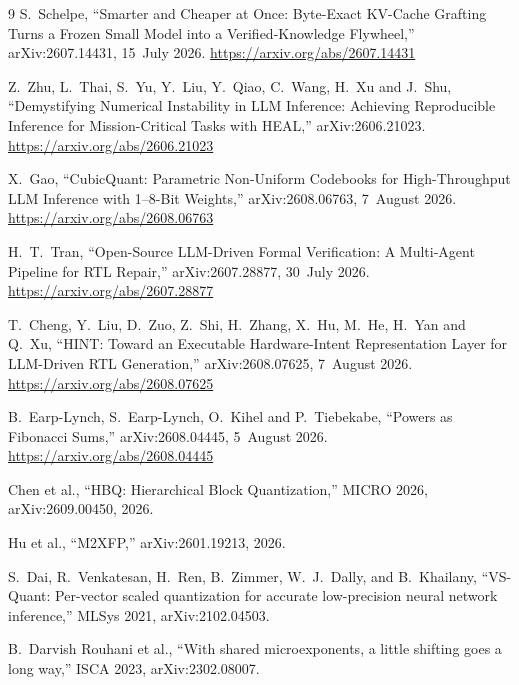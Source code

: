 \documentclass[11pt]{article}
\theoremstyle{definition}
\begin{document}
\begin{thebibliography}{9}
 S.~Schelpe, ``Smarter and Cheaper at Once: Byte-Exact KV-Cache Grafting Turns a Frozen Small Model into a Verified-Knowledge Flywheel,'' arXiv:2607.14431, 15~July 2026. \url{https://arxiv.org/abs/2607.14431}

 Z.~Zhu, L.~Thai, S.~Yu, Y.~Liu, Y.~Qiao, C.~Wang, H.~Xu and J.~Shu, ``Demystifying Numerical Instability in LLM Inference: Achieving Reproducible Inference for Mission-Critical Tasks with HEAL,'' arXiv:2606.21023. \url{https://arxiv.org/abs/2606.21023}

 X.~Gao, ``CubicQuant: Parametric Non-Uniform Codebooks for High-Throughput LLM Inference with 1--8-Bit Weights,'' arXiv:2608.06763, 7~August 2026. \url{https://arxiv.org/abs/2608.06763}

 H.~T.~Tran, ``Open-Source LLM-Driven Formal Verification: A Multi-Agent Pipeline for RTL Repair,'' arXiv:2607.28877, 30~July 2026. \url{https://arxiv.org/abs/2607.28877}

 T.~Cheng, Y.~Liu, D.~Zuo, Z.~Shi, H.~Zhang, X.~Hu,
M.~He, H.~Yan and Q.~Xu, ``HINT: Toward an Executable Hardware-Intent
Representation Layer for LLM-Driven RTL Generation,'' arXiv:2608.07625, 7~August
2026. \url{https://arxiv.org/abs/2608.07625}

 B.~Earp-Lynch, S.~Earp-Lynch, O.~Kihel and P.~Tiebekabe, ``Powers as Fibonacci Sums,'' arXiv:2608.04445, 5~August 2026. \url{https://arxiv.org/abs/2608.04445}

 Chen et al., ``HBQ: Hierarchical Block Quantization,'' MICRO 2026, arXiv:2609.00450, 2026.

 Hu et al., ``M2XFP,'' arXiv:2601.19213, 2026.

 S.~Dai, R.~Venkatesan, H.~Ren, B.~Zimmer, W.~J.~Dally, and B.~Khailany, ``VS-Quant: Per-vector scaled quantization for accurate low-precision neural network inference,'' MLSys 2021, arXiv:2102.04503.

 B.~Darvish Rouhani et al., ``With shared microexponents, a little shifting goes a long way,'' ISCA 2023, arXiv:2302.08007.

\end{thebibliography}
\end{document}
